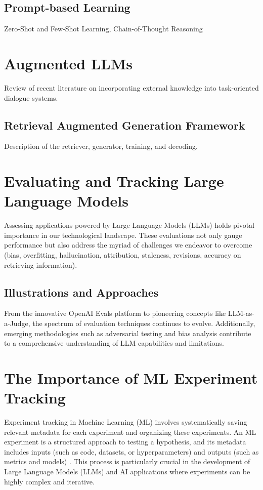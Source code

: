 \subsection{Prompt-based Learning}
Zero-Shot and Few-Shot Learning, Chain-of-Thought Reasoning

\section{Augmented LLMs}
Review of recent literature on incorporating external knowledge into task-oriented dialogue systems.

\subsection{Retrieval Augmented Generation Framework}
Description of the retriever, generator, training, and decoding.

\section{Evaluating and Tracking Large Language Models}
Assessing applications powered by Large Language Models (LLMs) holds pivotal importance in our technological landscape. These evaluations not only gauge performance but also address the myriad of challenges we endeavor to overcome (bias, overfitting, hallucination, attribution, staleness, revisions, accuracy on retrieving information).

\subsection{Illustrations and Approaches}

From the innovative OpenAI Evals platform to pioneering concepts like LLM-as-a-Judge, the spectrum of evaluation techniques continues to evolve. Additionally, emerging methodologies such as adversarial testing and bias analysis contribute to a comprehensive understanding of LLM capabilities and limitations.

\newpage

\section{The Importance of ML Experiment Tracking}

Experiment tracking in Machine Learning (ML) involves systematically saving relevant metadata for each experiment and organizing these experiments. An ML experiment is a structured approach to testing a hypothesis, and its metadata includes inputs (such as code, datasets, or hyperparameters) and outputs (such as metrics and models) \cite{wandb2023}. This process is particularly crucial in the development of Large Language Models (LLMs) and AI applications where experiments can be highly complex and iterative.


